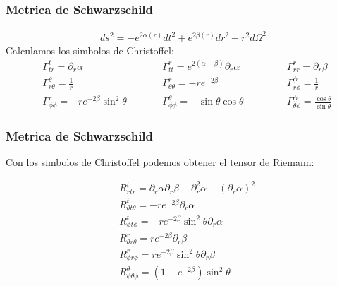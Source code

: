 \documentclass{beamer}
\begin{document}


\begin{frame}
\frametitle{Metrica de Schwarzschild}

\begin{gather*}
  ds^2 = - e ^ {2\alpha(r)}dt^2 + e ^ {2 \beta (r) } dr^2 + r^2 d \Omega^2  
\end{gather*}
Calculamos los simbolos de Christoffel:
\begin{align*}
  &\Gamma_{t r}^t=\partial _r \alpha \qquad &&\Gamma_{t t}^r=e^{2(\alpha-\beta)} \partial_r \alpha \qquad &&&\Gamma_{r r}^{r}=\partial_r \beta \\
  &\Gamma_{r \theta}^\theta=\frac{1}{r} \qquad &&\Gamma_{\theta \theta}^r=-r e^{-2 \beta} \qquad &&&\Gamma_{r \phi}^\phi=\frac{1}{r} \\
  &\Gamma_{\phi \phi}^r=-r e^{-2 \beta} \sin ^2 \theta \qquad &&\Gamma_{\phi \phi}^\theta=-\sin \theta \cos \theta \qquad &&&\Gamma_{\theta \phi}^\phi=\frac{\cos \theta}{\sin \theta}
\end{align*}
\end{frame}




\begin{frame}
\frametitle{Metrica de Schwarzschild}

Con los simbolos de Christoffel podemos obtener el tensor de Riemann: 

\begin{align*}
  &R_{r t r}^{t}=\partial_r \alpha \partial_r \beta-\partial_r^2 \alpha-(\partial_r \alpha)^2 \\
  &R_{\theta t \theta }^{t}=-r e^{-2 \beta} \partial_r \alpha \\
  &R_{\phi t \phi}^t=-r e^{-2 \beta} \sin ^2 \theta \partial_r \alpha \\
  &R_{\theta r \theta}^r=r e^{-2 \beta} \partial_r \beta \\
  &R_{\phi r \phi}^{r}=r e^{-2 \beta} \sin ^2 \theta \partial_r \beta \\
  &R _{\phi \theta \phi } ^ {\theta }=\left(1-e^{-2 \beta}\right) \sin ^2 \theta 
\end{align*}


\end{frame}


\end{document}
